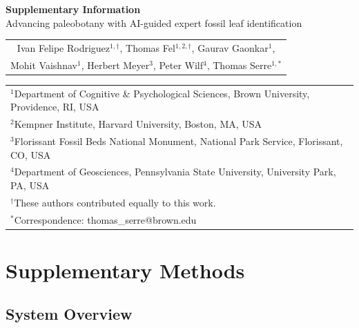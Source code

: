 \documentclass[pdflatex,lineno,sn-nature]{sn-jnl}%
\theoremstyle{plain}%
\theoremstyle{definition}%
\theoremstyle{remark}%
\begin{document}
\begin{oldappendices}

\begin{center}
{\LARGE \textbf{Supplementary Information}}\\[1em]
{\large Advancing paleobotany with AI-guided expert fossil leaf identification}\\[2em]

\begin{tabular}{c}
Ivan Felipe Rodriguez$^{1,\dagger}$, Thomas Fel$^{1,2,\dagger}$, Gaurav Gaonkar$^{1}$,\\
Mohit Vaishnav$^{1}$, Herbert Meyer$^{3}$, Peter Wilf$^{4}$, Thomas Serre$^{1,*}$\\[1em]
\end{tabular}

{\small
\begin{tabular}{l}
$^{1}$Department of Cognitive \& Psychological Sciences, Brown University, Providence, RI, USA\\
$^{2}$Kempner Institute, Harvard University, Boston, MA, USA\\
$^{3}$Florissant Fossil Beds National Monument, National Park Service, Florissant, CO, USA\\
$^{4}$Department of Geosciences, Pennsylvania State University, University Park, PA, USA\\[0.5em]
$^{\dagger}$These authors contributed equally to this work.\\
$^{*}$Correspondence: thomas\_serre@brown.edu\\
\end{tabular}
}
\end{center}

\vspace{1cm}

\tableofcontents
\clearpage


\section{Supplementary Methods}

\subsection{System Overview}


\end{oldappendices}
\end{document}

